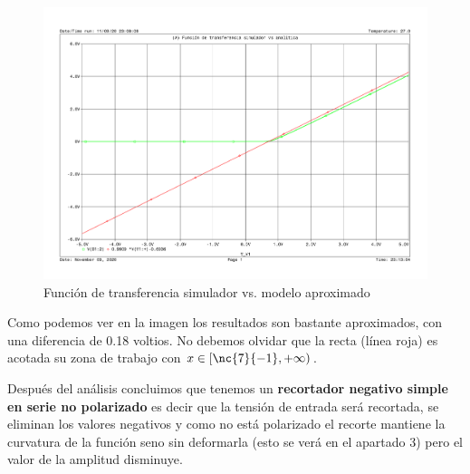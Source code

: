 {\begin{figure}[H]
\centering
\includegraphics[scale=0.5]{images/compative_transfer.pdf}
\caption{Función de transferencia simulador vs. modelo aproximado}
\label{transfer_function_comparative}
\end{figure}

Como podemos ver en la imagen los resultados son bastante aproximados,
con una diferencia de 0.18 voltios. No debemos olvidar que la
recta (línea roja) es acotada su zona de trabajo con $x \in
[\nc{7}{-1},+\infty)$.

Después del análisis concluimos que tenemos un
\textbf{recortador negativo simple en serie no polarizado} es
decir que la tensión de entrada será recortada, se eliminan los
valores negativos y como no está polarizado el recorte mantiene
la curvatura de la función seno sin deformarla (esto se verá en
el apartado 3) pero el valor de la amplitud disminuye.
      
}

